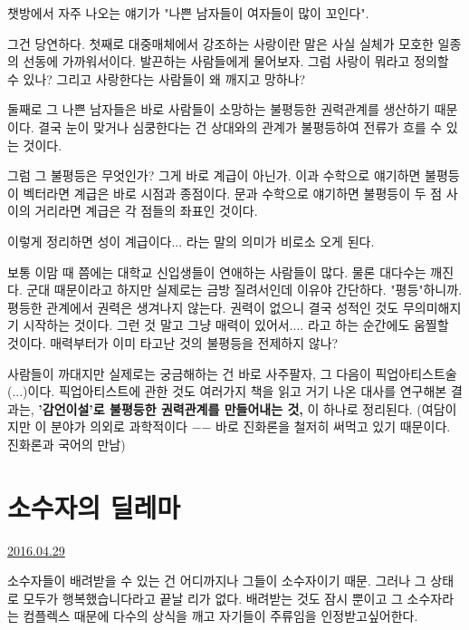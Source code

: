 챗방에서 자주 나오는 얘기가 "나쁜 남자들이 여자들이 많이 꼬인다".
\vspace{5mm}

그건 당연하다.
첫째로 대중매체에서 강조하는 사랑이란 말은 사실 실체가 모호한 일종의 선동에 가까워서이다.
발끈하는 사람들에게 물어보자. 그럼 사랑이 뭐라고 정의할 수 있나? 그리고 사랑한다는 사람들이 왜 깨지고 망하나?
\vspace{5mm}

둘째로 그 나쁜 남자들은 바로 사람들이 소망하는 불평등한 권력관계를 생산하기 때문이다.
결국 눈이 맞거나 심쿵한다는 건 상대와의 관계가 불평등하여 전류가 흐를 수 있는 것이다.
\vspace{5mm}

그럼 그 불평등은 무엇인가? 그게 바로 계급이 아닌가.
이과 수학으로 얘기하면 불평등이 벡터라면 계급은 바로 시점과 종점이다.
문과 수학으로 얘기하면 불평등이 두 점 사이의 거리라면 계급은 각 점들의 좌표인 것이다.
\vspace{5mm}

이렇게 정리하면 성이 계급이다... 라는 말의 의미가 비로소 오게 된다.
\vspace{5mm}

보통 이맘 때 쯤에는 대학교 신입생들이 연애하는 사람들이 많다. 물론 대다수는 깨진다.
군대 때문이라고 하지만 실제로는 금방 질려서인데 이유야 간단하다. "평등"하니까.
평등한 관계에서 권력은 생겨나지 않는다. 권력이 없으니 결국 성적인 것도 무의미해지기 시작하는 것이다.
그런 것 말고 그냥 매력이 있어서.... 라고 하는 순간에도 움찔할 것이다. 매력부터가 이미 타고난 것의 불평등을 전제하지 않나?
\vspace{5mm}

사람들이 까대지만 실제로는 궁금해하는 건 바로 사주팔자, 그 다음이 픽업아티스트술(...)이다.
픽업아티스트에 관한 것도 여러가지 책을 읽고 거기 나온 대사를 연구해본 결과는,
\textbf{'감언이설'로 불평등한 권력관계를 만들어내는 것,} 이 하나로 정리된다.
(여담이지만 이 분야가 의외로 과학적이다 $-$$-$ 바로 진화론을 철저히 써먹고 있기 때문이다. 진화론과 국어의 만남)
\vspace{5mm}



\section{소수자의 딜레마}
\href{https://www.kockoc.com/Apoc/751570}{2016.04.29}

\vspace{5mm}

소수자들이 배려받을 수 있는 건 어디까지나 그들이 소수자이기 때문.
그러나 그 상태로 모두가 행복했습니다라고 끝날 리가 없다.
배려받는 것도 잠시 뿐이고 그 소수자라는 컴플렉스 때문에 다수의 상식을 깨고 자기들이 주류임을 인정받고싶어한다.
\vspace{5mm}

